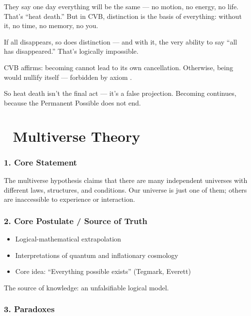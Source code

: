\documentclass[12pt]{article}
\begin{document}
They say one day everything will be the same — no motion, no energy, no life. That’s ``heat death.'' But in CVB, distinction is the basis of everything: without it, no time, no memory, no you.

If all disappears, so does distinction — and with it, the very ability to say ``all has disappeared.'' That’s logically impossible.

CVB affirms: becoming cannot lead to its own cancellation. Otherwise, being would nullify itself — forbidden by axiom \text{[1]}.

So heat death isn’t the final act — it’s a false projection. Becoming continues, because the Permanent Possible \text{[4.4]} does not end.

\section*{🔷 Multiverse Theory}

\subsubsection*{1. Core Statement}

The multiverse hypothesis claims that there are many independent universes with different laws, structures, and conditions. Our universe is just one of them; others are inaccessible to experience or interaction.

\subsubsection*{2. Core Postulate / Source of Truth}

\begin{itemize}
\item Logical-mathematical extrapolation
\item Interpretations of quantum and inflationary cosmology
\item Core idea: ``Everything possible exists'' (Tegmark, Everett)
\end{itemize}

The source of knowledge: an unfalsifiable logical model.

\subsubsection*{3. Paradoxes}
\end{document}
